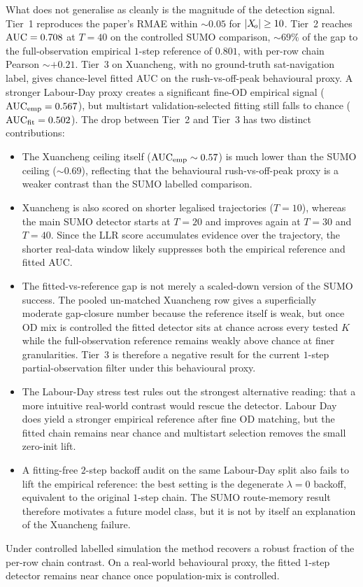 What does not generalise as cleanly is the magnitude of the
detection signal. Tier~1 reproduces the paper's RMAE within
$\sim 0.05$ for $|X_{\!o}| \ge 10$. Tier~2 reaches $\mathrm{AUC} = 0.708$ at $T=40$
on the controlled SUMO comparison, $\sim 69\%$ of the gap to the
full-observation empirical $1$-step reference of $0.801$, with per-row
chain Pearson $\sim +0.21$. Tier~3 on Xuancheng, with no ground-truth
sat-navigation label, gives chance-level fitted AUC on the
rush-vs-off-peak behavioural proxy. A stronger Labour-Day proxy creates
a significant fine-OD empirical signal ($\mathrm{AUC}_{\mathrm{emp}}=0.567$),
but multistart validation-selected fitting still falls to chance
($\mathrm{AUC}_{\mathrm{fit}}=0.502$). The drop
between Tier~2 and Tier~3 has two distinct contributions:
\begin{itemize}
\item The Xuancheng ceiling itself ($\mathrm{AUC}_{\mathrm{emp}} \sim 0.57$) is
much lower than the SUMO ceiling ($\sim 0.69$), reflecting that the
behavioural rush-vs-off-peak proxy is a weaker contrast than the
SUMO labelled comparison.
\item Xuancheng is also scored on shorter legalised trajectories
($T=10$), whereas the main SUMO detector starts at $T=20$ and improves
again at $T=30$ and $T=40$. Since the LLR score accumulates evidence over
the trajectory, the shorter real-data window likely suppresses both the
empirical reference and fitted AUC.
\item The fitted-vs-reference gap is not merely a scaled-down
version of the SUMO success. The pooled un-matched Xuancheng row gives
a superficially moderate gap-closure number because the reference itself
is weak, but once OD mix is controlled the fitted detector sits at chance
across every tested $K$ while the full-observation reference remains
weakly above chance at finer granularities. Tier~3 is therefore a
negative result for the current $1$-step partial-observation filter
under this behavioural proxy.
\item The Labour-Day stress test rules out the strongest alternative
reading: that a more intuitive real-world contrast would rescue the
detector. Labour Day does yield a stronger empirical reference after
fine OD matching, but the fitted chain remains near chance and multistart
selection removes the small zero-init lift.
\item A fitting-free $2$-step backoff audit on the same Labour-Day split
also fails to lift the empirical reference: the best setting is the
degenerate $\lambda=0$ backoff, equivalent to the original $1$-step
chain. The SUMO route-memory result therefore motivates a future model
class, but it is not by itself an explanation of the Xuancheng failure.
\end{itemize}
Under controlled labelled simulation the method recovers a robust
fraction of the per-row chain contrast. On a real-world behavioural
proxy, the fitted $1$-step detector remains near chance once
population-mix is controlled.

